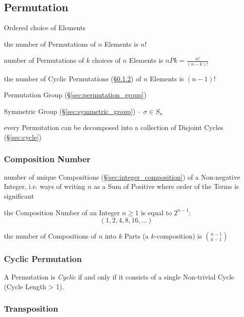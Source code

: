 \subsection{Permutation}\label{sec:permutation}

Ordered choice of Elements

the number of Permutations of $n$ Elements is $n!$

number of Permutations of $k$ choices of $n$ Elements is
$nPk = \frac{n!}{(n-k)!}$

the number of Cyclic Permutations (\S\ref{sec:cyclic_permutation}) of $n$
Elements is $(n-1)!$

Permutation Group (\S\ref{sec:permutation_group})

Symmetric Group (\S\ref{sec:symmetric_group}) -- $\sigma \in S_n$

every Permutation can be decomposed into a collection of Disjoint Cycles
(\S\ref{sec:cycle})



\subsubsection{Composition Number}\label{sec:composition_number}

number of unique Compositions (\S\ref{sec:integer_composition}) of a
Non-negative Integer, i.e. ways of writing $n$ as a Sum of Positive where order
of the Terms is significant

the Composition Number of an Integer $n \geq 1$ is equal to $2^{n-1}$:
\[
  (1, 2, 4, 8, 16, \ldots)
\]

the number of Compositions of $n$ into $k$ Parts (a $k$-composition) is
$\binom{n-1}{k-1}$



\subsubsection{Cyclic Permutation}\label{sec:cyclic_permutation}

A Permutation is \emph{Cyclic} if and only if it consists of a single
Non-trivial Cycle (Cycle Length > 1).



\subsubsection{Transposition}\label{sec:transposition}

